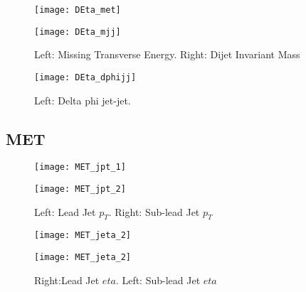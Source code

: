 \documentclass[a4paper,10pt]{article}
\begin{document}
\begin{figure}[!h]
\centering
\begin{minipage}[!h]{0.4\linewidth}
\centering
\texttt{[image: DEta\_met]}
\end{minipage}%
\begin{minipage}[!h]{0.4\linewidth}
\centering
\texttt{[image: DEta\_mjj]}
\end{minipage}
\caption{Left: Missing Transverse Energy. Right: Dijet Invariant Mass}
\end{figure}

\begin{figure}[!h]
\centering
\begin{minipage}[!h]{0.4\linewidth}
\centering
\texttt{[image: DEta\_dphijj]}
\end{minipage}%
\begin{minipage}[!h]{0.4\linewidth}
\centering
\end{minipage}
\caption{Left: Delta phi jet-jet.}
\end{figure}

\clearpage
\subsection{MET}
     
\begin{figure}[!h]
\centering
\begin{minipage}[!h]{0.4\linewidth}
\centering
\texttt{[image: MET\_jpt\_1]}
\end{minipage}%
\begin{minipage}[!h]{0.4\linewidth}
  \texttt{[image: MET\_jpt\_2]}
\end{minipage}
\caption{Left: Lead Jet $p_T$. Right: Sub-lead Jet $p_T$}
\end{figure}

\begin{figure}[!h]
\centering
\begin{minipage}[!h]{0.4\linewidth}
\centering
\texttt{[image: MET\_jeta\_2]}
\end{minipage}%
\begin{minipage}[!h]{0.4\linewidth}
\centering
\texttt{[image: MET\_jeta\_2]}
\end{minipage}
\caption{Right:Lead Jet $eta$. Left: Sub-lead Jet $eta$}
\end{figure}
\end{document}
